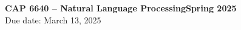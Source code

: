 \documentclass[10pt]{article}
\begin{document}
\noindent \textbf{CAP 6640 -- Natural Language Processing\hspace*{\fill}Spring 2025}\\
 \hfill Due date: March 13, 2025

\end{document}
